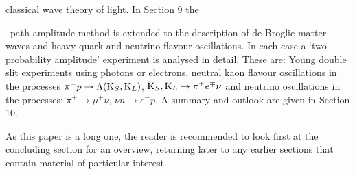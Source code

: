   classical wave theory of light. In Section 9 the{\ path amplitude method is extended to the
    description of de Broglie matter waves and heavy quark and neutrino flavour oscillations.
    In each case a `two probability amplitude' experiment is analysed in detail. These are:
    Young double slit experiments using photons or electrons, neutral kaon flavour oscillations
   in the processes $\pi^- p \rightarrow \Lambda ({\rm K}_S,{\rm K}_L)$, ${\rm K}_S,{\rm K}_L
    \rightarrow \pi^{\pm} e^{\mp} \nu$ and neutrino oscillations in the processes:
    $\pi^+ \rightarrow \mu^+ \nu$, $\nu n \rightarrow e^- p$.
    A summary and outlook are given in Section 10.
    \par As this paper is a long one, the reader is recommended to look first at the concluding
     section for an overview, returning later to any earlier sections that contain material of
     particular interest.

}
